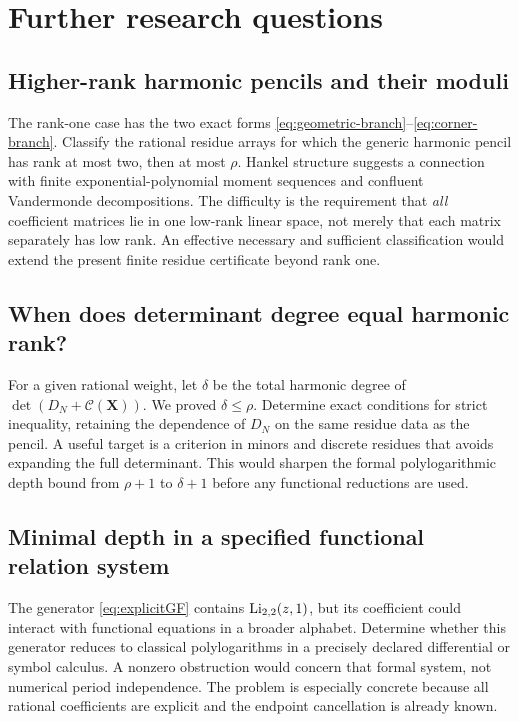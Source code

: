 \section{Further research questions}
\label{sec:questions}

\subsection{Higher-rank harmonic pencils and their moduli}
The rank-one case has the two exact forms
\eqref{eq:geometric-branch}--\eqref{eq:corner-branch}. Classify the
rational residue arrays for which the generic harmonic pencil has rank
at most two, then at most $\rho$. Hankel structure suggests a connection
with finite exponential-polynomial moment sequences and confluent
Vandermonde decompositions. The difficulty is the requirement that
\emph{all} coefficient matrices lie in one low-rank linear space, not
merely that each matrix separately has low rank. An effective necessary
and sufficient classification would extend the present finite residue
certificate beyond rank one.

\subsection{When does determinant degree equal harmonic rank?}
For a given rational weight, let $\delta$ be the total harmonic degree
of $\det(D_N+\mathscr C(\bm X))$. We proved $\delta\le\rho$.
Determine exact conditions for strict inequality, retaining the dependence
of $D_N$ on the same residue data as the pencil. A useful target is a
criterion in minors and discrete residues that avoids expanding the full
determinant. This would sharpen the formal polylogarithmic depth bound
from $\rho+1$ to $\delta+1$ before any functional reductions are used.

\subsection{Minimal depth in a specified functional relation system}
The generator \eqref{eq:explicitGF} contains $\operatorname{Li}_{2,2}(z,1)$, but
its coefficient could interact with functional equations in a broader
alphabet. Determine whether this generator reduces to classical
polylogarithms in a precisely declared differential or symbol calculus.
A nonzero obstruction would concern that formal system, not numerical
period independence. The problem is especially concrete because all
rational coefficients are explicit and the endpoint cancellation is
already known.

